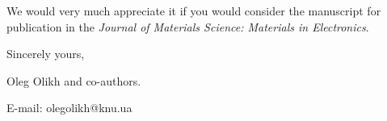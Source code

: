 \documentclass[preprint]{elsarticle}
\begin{document}

We would  very much appreciate it if you would consider the manuscript for publication in the \emph{Journal of Materials Science: Materials in Electronics}.

\vspace{3mm}

Sincerely yours,

Oleg Olikh and co-authors.

E-mail: olegolikh@knu.ua


\end{document}
